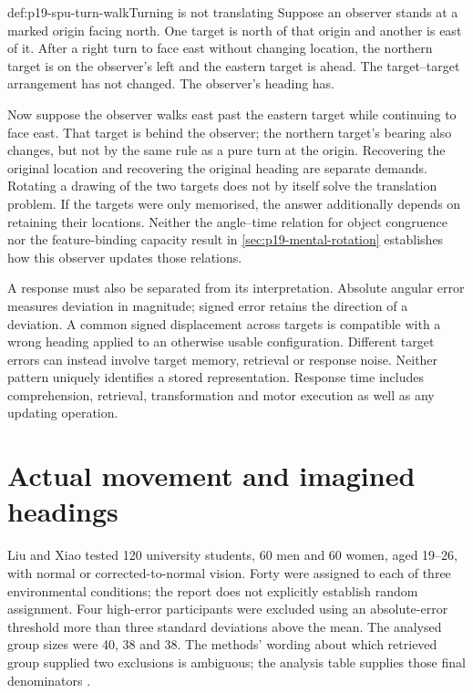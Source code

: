 \begin{hbexample}{def:p19-spu-turn-walk}{Turning is not translating}
Suppose an observer stands at a marked origin facing north.
One target is north of that origin and another is east of it.
After a right turn to face east without changing location, the
northern target is on the observer's left and the eastern target
is ahead. The target--target arrangement has not changed.
The observer's heading has.

Now suppose the observer walks east past the eastern target while
continuing to face east. That target is behind the observer; the
northern target's bearing also changes, but not by the same rule as
a pure turn at the origin. Recovering the original location and
recovering the original heading are separate demands.
Rotating a drawing of the two targets does not by itself solve the
translation problem. If the targets were only memorised, the answer
additionally depends on retaining their locations. Neither the
angle--time relation for object congruence nor the feature-binding
capacity result in \cref{sec:p19-mental-rotation} establishes how this
observer updates those relations.
\end{hbexample}

A response must also be separated from its interpretation.
Absolute angular error measures deviation in magnitude; signed error
retains the direction of a deviation. A common signed displacement
across targets is compatible with a wrong heading applied to an
otherwise usable configuration. Different target errors can instead
involve target memory, retrieval or response noise.
Neither pattern uniquely identifies a stored representation.
Response time includes comprehension, retrieval, transformation and
motor execution as well as any updating operation.

\section{Actual movement and imagined headings}
\label{sec:p19-spu-updating}

Liu and Xiao tested 120 university students, 60 men and 60 women,
aged 19--26, with normal or corrected-to-normal vision. Forty were assigned to each of
three environmental conditions; the report does not explicitly
establish random assignment. Four high-error participants were
excluded using an absolute-error threshold more than three standard
deviations above the mean. The analysed group sizes were 40, 38 and
38. The methods' wording about which retrieved group supplied two
exclusions is ambiguous; the analysis table supplies those final
denominators \cite[Methods and Table 1]{LiuXiao2018UpdatingSPU}.

